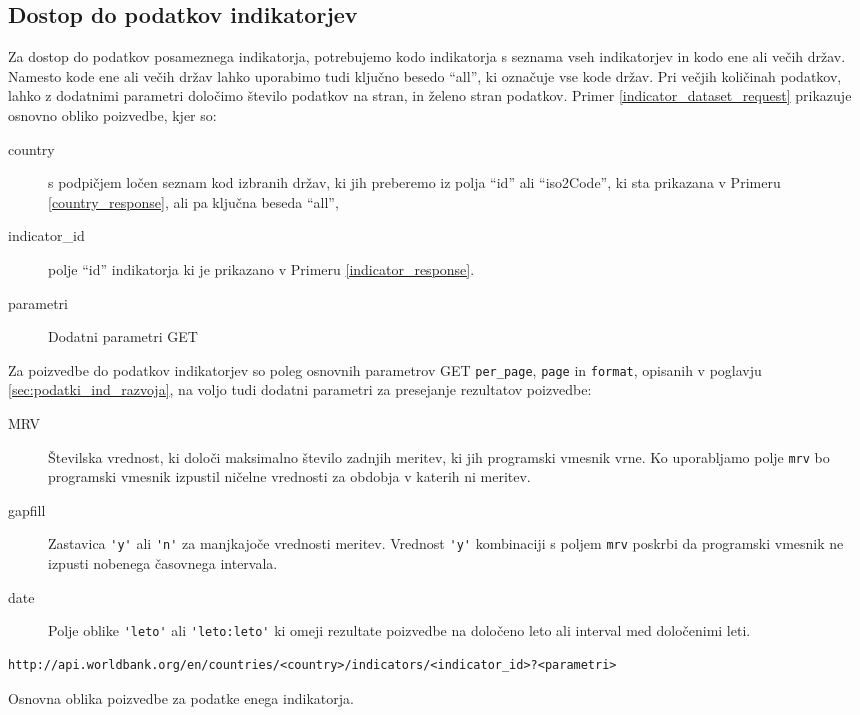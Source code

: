 \subsection{Dostop do podatkov indikatorjev}

Za dostop do podatkov posameznega indikatorja, potrebujemo kodo
indikatorja s seznama vseh indikatorjev in kodo ene ali večih držav. Namesto
kode ene ali večih držav lahko uporabimo tudi ključno besedo ``all'', ki
označuje vse kode držav. Pri večjih količinah podatkov, lahko z dodatnimi
parametri določimo število podatkov na stran, in želeno stran podatkov.
Primer \ref{indicator_dataset_request} prikazuje osnovno obliko poizvedbe,
kjer so:
\begin{description}
\item [country] s podpičjem ločen seznam kod izbranih držav, ki jih 
	  preberemo iz polja ``id'' ali ``iso2Code'', ki sta prikazana v Primeru 
    \ref{country_response}, ali pa ključna beseda ``all'',
\item [indicator\_id] polje ``id'' indikatorja ki je prikazano v Primeru 
    \ref{indicator_response}.
\item [parametri] Dodatni parametri GET 
\end{description}
Za poizvedbe do podatkov indikatorjev so poleg osnovnih parametrov GET 
\verb|per_page|, \verb|page| in \verb|format|, opisanih v poglavju 
\ref{sec:podatki_ind_razvoja}, na voljo tudi dodatni parametri za presejanje
rezultatov poizvedbe:
\begin{description}  
\item [MRV] Številska vrednost, ki določi maksimalno število zadnjih meritev,
    ki jih programski vmesnik vrne. Ko uporabljamo polje \verb|mrv| bo 
    programski vmesnik izpustil ničelne vrednosti za obdobja v katerih ni
    meritev.
\item [gapfill] Zastavica \verb|'y'| ali \verb|'n'| za manjkajoče vrednosti meritev.
    Vrednost \verb|'y'| kombinaciji s poljem \verb|mrv| poskrbi da programski 
    vmesnik ne izpusti nobenega časovnega intervala.
\item [date] Polje oblike \verb|'leto'| ali \verb|'leto:leto'| ki omeji rezultate poizvedbe
    na določeno leto ali interval med določenimi leti. 
\end{description}


\begin{snippet}
\begin{center}
\begin{lstlisting}
http://api.worldbank.org/en/countries/<country>/indicators/<indicator_id>?<parametri>
\end{lstlisting}
\end{center}
\caption{Osnovna oblika poizvedbe za podatke enega indikatorja.}
\label{indicator_dataset_request}
\end{snippet} 

